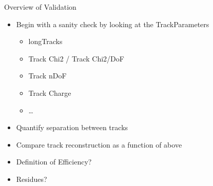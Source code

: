 \begin{frame}{Overview of Validation }
    \begin{itemize}
        \item Begin with a sanity check by looking at the TrackParameters
        \begin{itemize}
            \item longTracks
            \item Track Chi2 / Track Chi2/DoF
            \item Track nDoF
            \item Track Charge
            \item \ldots
        \end{itemize}
        \item Quantify separation between tracks
        \item Compare track reconstruction as a function of above
        \item Definition of Efficiency?
        \item Residues? 

        
    \end{itemize}

\end{frame}